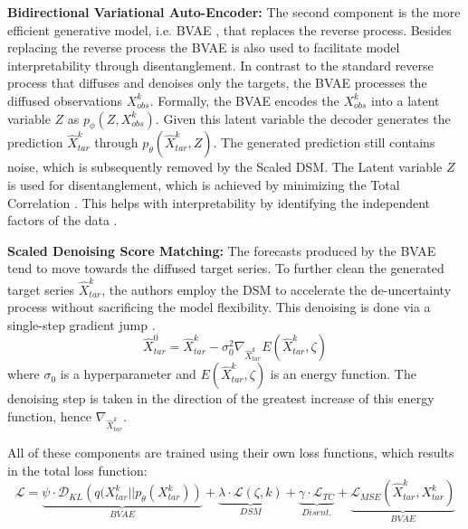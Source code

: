 \textbf{Bidirectional Variational Auto-Encoder:}
The second component is the more efficient generative model, i.e. BVAE \cite{vahdat_nvae_2020}, that replaces the reverse process. Besides replacing the reverse process the BVAE is also used to facilitate model interpretability through disentanglement. In contrast to the standard reverse process that diffuses and denoises only the targets, the BVAE processes the diffused observations $X_{obs}^k$. Formally, the BVAE encodes the $X_{obs}^k$ into a latent variable $Z$ as $p_\phi(Z, X_{obs}^k)$. Given this latent variable the decoder generates the prediction $\hat{X}_{tar}^k$ through $p_\theta(\hat{X}_{tar}^k, Z)$. The generated prediction still contains noise, which is subsequently removed by the Scaled DSM. The Latent variable $Z$ is used for disentanglement, which is achieved by minimizing the Total Correlation \cite{watanabe_information_1960, kim_disentangling_2018}. This helps with interpretability by identifying the independent factors of the data \cite{li_learning_2021, lake_building_2017, higgins_beta-vae_2016}.

\textbf{Scaled Denoising Score Matching:}
The forecasts produced by the BVAE tend to move towards the diffused target series. To further clean the generated target series $\hat{X}_{tar}^k$, the authors employ the DSM to accelerate the de-uncertainty process without sacrificing the model flexibility. This denoising is done via a single-step gradient jump \cite{saremi_neural_2019}.
\begin{equation}
    \hat{X}_{tar}^0 = \hat{X}_{tar}^k - \sigma_0^2 \nabla_{\hat{X}_{tar}^k} E(\hat{X}_{tar}^k, \zeta)
\end{equation}
where $\sigma_0$ is a hyperparameter and $E(\hat{X}_{tar}^k, \zeta)$ is an energy function. The denoising step is taken in the direction of the greatest increase of this energy function, hence $\nabla_{\hat{X}_{tar}^k}$. 

All of these components are trained using their own loss functions, which results in the total loss function:
\begin{equation}
    \mathcal{L} = \underbrace{\psi \cdot \mathcal{D}_{KL} \left(q(X_{tar}^k || p_\theta(X_{tar}^k) \right)}_{BVAE} + \underbrace{\lambda \cdot \mathcal{L}(\zeta, k)}_{DSM} + \underbrace{\gamma \cdot \mathcal{L}_{TC}}_{Disent.} + \underbrace{\mathcal{L}_{MSE}(\hat{X}_{tar}^k, X_{tar}^k)}_{BVAE}
\end{equation}

